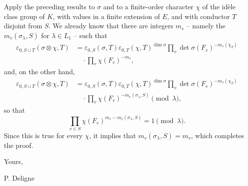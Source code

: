 \documentclass[11pt]{article}
\newcommand{\dimn}{\operatorname{dim}}
\newcommand{\eps}{\varepsilon}
\begin{document}
Apply the preceding results to $\sigma$ and to a finite-order character $\chi$ of the idèle class group of $K$, with values in a finite extension of $E$, and with conductor $T$ disjoint from $S$. We already know that there are integers $m_v$ -- namely the $m_v(\sigma_\lambda,S)$ for $\lambda\in L_1$ -- such that
\[
\begin{aligned}
 \eps_{0,S\cup T}(\sigma\otimes\chi,T)
 &=\eps_{0,S}(\sigma,T)\eps_{0,T}(\chi,T)^{\dimn\sigma}
 \prod_v \det\sigma(F_v)^{-m_v(\chi_T)}\\
 &\quad\cdot \prod_v \chi(F_v)^{-m_v},
\end{aligned}
\]
and, on the other hand,
\[
\begin{aligned}
 \eps_{0,S\cup T}(\sigma\otimes\chi,T)
 &=\eps_{0,S}(\sigma,T)\eps_{0,T}(\chi,T)^{\dimn\sigma}
 \prod_v \det\sigma(F_v)^{-m_v(\chi_T)}\\
 &\quad\cdot \prod_v \chi(F_v)^{-m_v(\sigma_\lambda,S)}
 \pmod{\lambda},
\end{aligned}
\]
so that
\[
 \prod_{v\in S}\chi(F_v)^{m_v-m_v(\sigma_\lambda,S)}=1\pmod{\lambda}.
\]
Since this is true for every $\chi$, it implies that $m_v(\sigma_\lambda,S)=m_v$, which completes the proof.

\vspace{1cm}
\begin{center}
Yours,

\vspace{0.5cm}
P. Deligne
\end{center}
\end{document}
